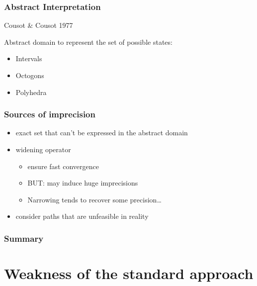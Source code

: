 \documentclass{beamer}
\begin{document}
\begin{frame}
\frametitle{Abstract Interpretation}

Cousot \& Cousot 1977

\bigskip

Abstract domain to represent the set of possible states:
\begin{itemize}
\item Intervals
\item Octogons
\item Polyhedra
\end{itemize}

\bigskip

\end{frame}


\begin{frame}
\frametitle{Sources of imprecision}
\begin{itemize}
\item<1-> exact set that can't be expressed in the abstract domain
\item<2-> \alert<4>{widening operator}
\begin{itemize}
\item ensure fast convergence
\item BUT: may induce huge imprecisions
\item Narrowing tends to recover some precision\ldots
\end{itemize}
\item<3-> \alert<4>{consider paths that are unfeasible in reality}
\end{itemize}
\end{frame}

\begin{frame}
\frametitle{Summary}
\tableofcontents
\end{frame}


\section[Standard Approach]{Weakness of the standard approach}
\end{document}
